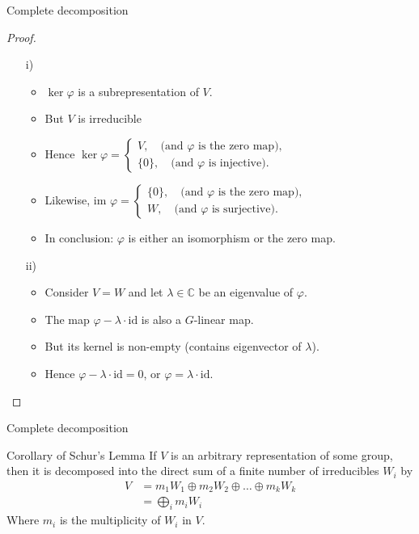 \documentclass[10pt]{beamer}
\newcommand{\id}{\text{id}}
\newcommand{\CC}{\mathbb{C}}
\begin{document}
	\begin{frame}{Complete decomposition}
		\begin{proof}
			\begin{itemize}
				\item[i)] \begin{itemize}
					\item $\ker\varphi$ is a subrepresentation of $V$.\pause
					\item But $V$ is irreducible
					\item Hence $\ker \varphi = \begin{cases}
						V, \quad \text{(and $\varphi$ is the zero map),} \\
						\{0\}, \quad \text{(and $\varphi$ is injective)}.
					\end{cases}$\pause
					\item Likewise, $\text{im } \varphi = \begin{cases}
						\{0\}, \quad \text{(and $\varphi$ is the zero map)}, \\
						W, \quad \text{(and $\varphi$ is surjective)}.
					\end{cases}$\pause
					\item In conclusion: $\varphi$ is either an isomorphism or the zero map.
				\end{itemize}\pause
				\item[ii)] \begin{itemize}
					\item Consider $V = W$ and let $\lambda \in \CC$ be an eigenvalue of $\varphi$.\pause
					
					\item The map $\varphi - \lambda \cdot \id$ is also a $G$-linear map.\pause
					
					\item But its kernel is non-empty (contains eigenvector of $\lambda$).\pause
					
					\item Hence $\varphi - \lambda \cdot \id = 0$, or $\varphi = \lambda \cdot \id$. \qedhere
				\end{itemize}
			\end{itemize}
		\end{proof}
	\end{frame}
	\begin{frame}{Complete decomposition}
		\begin{block}{Corollary of Schur's Lemma}
			If $V$ is an arbitrary representation of some group, then it is decomposed into the direct sum of a finite number of irreducibles $W_i$ by 
			\begin{align*}
				V &= m_1W_1 \oplus m_2W_2 \oplus \dots \oplus m_kW_k \\
				&= \bigoplus_i m_i W_i
			\end{align*}
			Where $m_i$ is the multiplicity of $W_i$ in $V$.
		\end{block}
	\end{frame}
	
\end{document}
